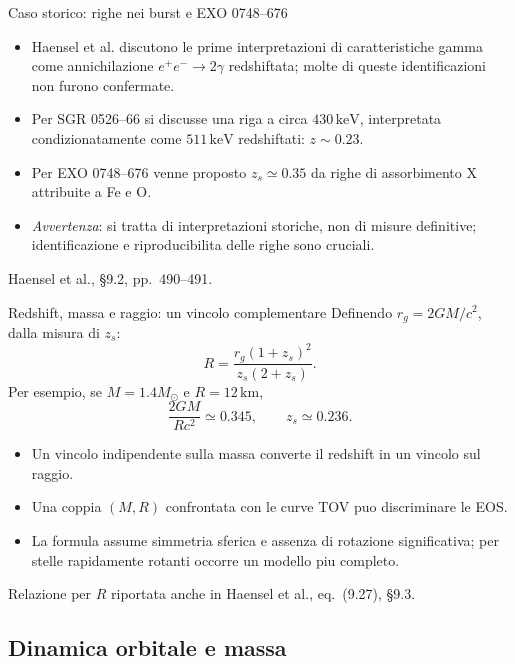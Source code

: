 \begin{frame}[t]{Caso storico: righe nei burst e EXO 0748--676}
\small
\begin{itemize}
\item Haensel et al. discutono le prime interpretazioni di caratteristiche gamma come annichilazione $e^+e^-\to2\gamma$ redshiftata; molte di queste identificazioni non furono confermate.
\item Per SGR 0526--66 si discusse una riga a circa $430\,\mathrm{keV}$, interpretata condizionatamente come $511\,\mathrm{keV}$ redshiftati: $z\sim0.23$.
\item Per EXO 0748--676 venne proposto $z_s\simeq0.35$ da righe di assorbimento X attribuite a Fe e O.
\item \emph{Avvertenza}: si tratta di interpretazioni storiche, non di misure definitive; identificazione e riproducibilita delle righe sono cruciali.
\end{itemize}
\medskip\footnotesize Haensel et al., \S9.2, pp.~490--491.
\end{frame}

\begin{frame}[t]{Redshift, massa e raggio: un vincolo complementare}
\small
Definendo $r_g=2GM/c^2$, dalla misura di $z_s$:
\[
R=\frac{r_g(1+z_s)^2}{z_s(2+z_s)}.
\]
Per esempio, se $M=1.4M_\odot$ e $R=12\,\mathrm{km}$,
\[
\frac{2GM}{Rc^2}\simeq0.345,\qquad z_s\simeq0.236.
\]
\begin{itemize}
\item Un vincolo indipendente sulla massa converte il redshift in un vincolo sul raggio.
\item Una coppia $(M,R)$ confrontata con le curve TOV puo discriminare le EOS.
\item La formula assume simmetria sferica e assenza di rotazione significativa; per stelle rapidamente rotanti occorre un modello piu completo.
\end{itemize}
\medskip\footnotesize Relazione per $R$ riportata anche in Haensel et al., eq.~(9.27), \S9.3.
\end{frame}


\subsection{Dinamica orbitale e massa}

